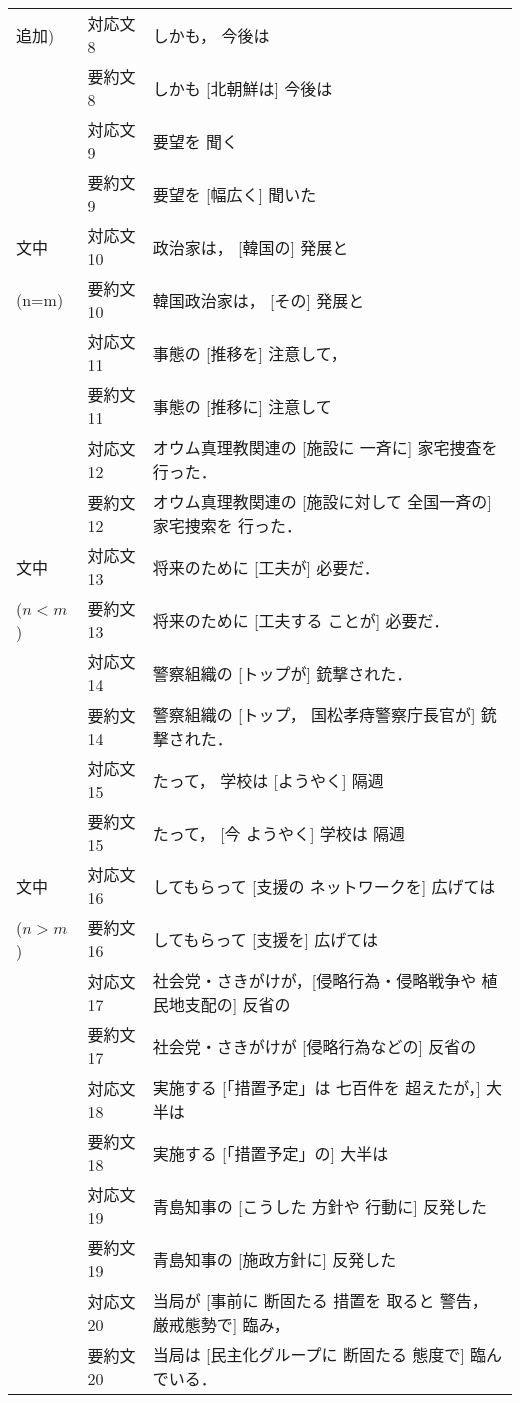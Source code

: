 \begin{table}
\begin{center}
\begin{tabular}{|l|ll|}
 追加) &対応文8 & しかも， 今後は \\
    &要約文8 & しかも [北朝鮮は] 今後は \\
    &対応文9 & 要望を 聞く \\ 
    &要約文9 & 要望を [幅広く] 聞いた \\ \hline
文中&対応文10 & 政治家は， [韓国の] 発展と \\
(n=m) &要約文10 & 韓国政治家は， [その] 発展と \\
    &対応文11 & 事態の [推移を] 注意して，\\
    &要約文11 & 事態の [推移に] 注意して \\
    &対応文12 & オウム真理教関連の [施設に 一斉に] 家宅捜査を 行った． \\
    &要約文12 & オウム真理教関連の [施設に対して 全国一斉の] 家宅捜索を 行った． \\ \hline
文中&対応文13   & 将来のために [工夫が] 必要だ．\\
($n<m$) &要約文13 & 将来のために [工夫する ことが] 必要だ．\\
    &対応文14 & 警察組織の [トップが] 銃撃された．\\
    &要約文14 & 警察組織の [トップ， 国松孝痔警察庁長官が] 銃撃された．\\
    &対応文15 & たって， 学校は [ようやく] 隔週\\
    &要約文15 & たって， [今 ようやく] 学校は 隔週\\ \hline
文中&対応文16 & してもらって [支援の ネットワークを] 広げては \\
($n>m$) &要約文16 & してもらって [支援を] 広げては \\
    &対応文17 & 社会党・さきがけが，[侵略行為・侵略戦争や 植民地支配の] 反省の \\
    &要約文17 & 社会党・さきがけが [侵略行為などの] 反省の\\
    &対応文18 & 実施する [「措置予定」は 七百件を 超えたが，] 大半は \\
    &要約文18 & 実施する [「措置予定」の] 大半は \\
    &対応文19 & 青島知事の [こうした 方針や 行動に] 反発した \\
    &要約文19 & 青島知事の [施政方針に] 反発した\\
    &対応文20 & 当局が [事前に 断固たる 措置を 取ると 警告， 厳戒態勢で] 臨み，\\
    &要約文20 & 当局は [民主化グループに 断固たる 態度で] 臨んでいる．\\ \hline
\end{tabular}
\end{center}
\end{table}



